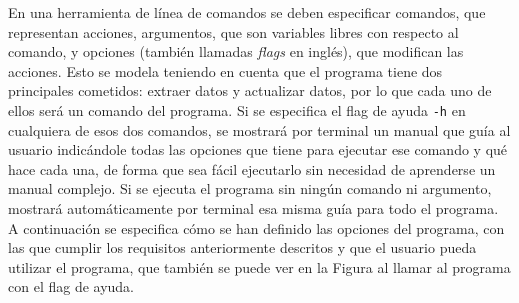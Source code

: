 En una herramienta de línea de comandos se deben especificar comandos, que
representan acciones, argumentos, que son variables libres con respecto al
comando, y opciones (también llamadas \textit{flags} en inglés), que modifican
las acciones. Esto se modela teniendo en cuenta que el programa tiene dos
principales cometidos: extraer datos y actualizar datos, por lo que cada uno de
ellos será un comando del programa. Si se especifica el flag de ayuda \texttt{-h} en 
cualquiera de esos dos comandos, se mostrará por terminal un
manual que guía al usuario indicándole todas las opciones que tiene para
ejecutar ese comando y qué hace cada una, de forma que sea fácil ejecutarlo sin
necesidad de aprenderse un manual complejo. Si se ejecuta el programa sin ningún
comando ni argumento, mostrará automáticamente por terminal esa misma guía para
todo el programa. A continuación se especifica cómo se han definido las opciones
del programa, con las que cumplir los requisitos anteriormente descritos y que el
usuario pueda utilizar el programa, que también se puede ver en la Figura al
llamar al programa con el flag de ayuda.
